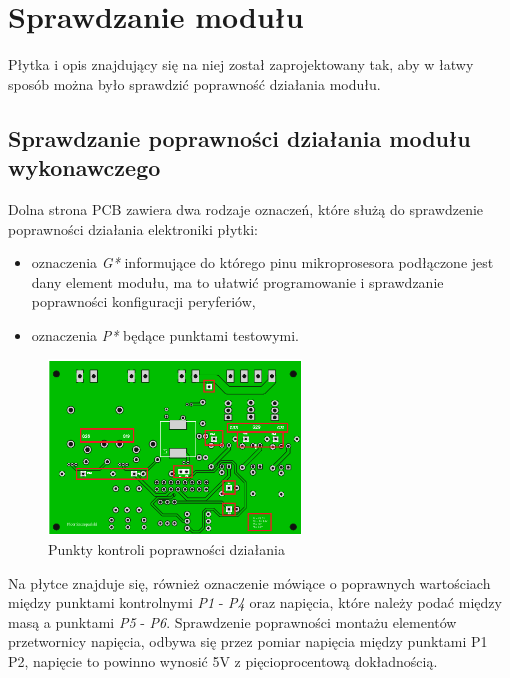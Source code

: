\documentclass[12pt, eng, twoside, openany, final]{mgr}
\begin{document}
    \section{Sprawdzanie modułu}
            Płytka i opis znajdujący się na niej został zaprojektowany tak, aby w łatwy sposób można było sprawdzić poprawność działania modułu. 
            
            \subsection{Sprawdzanie poprawności działania modułu wykonawczego}
            Dolna strona PCB zawiera dwa rodzaje oznaczeń, które służą do sprawdzenie poprawności działania elektroniki płytki:
            \begin{itemize}
                \item oznaczenia \emph{G*} informujące do którego pinu mikroprosesora podłączone jest dany element modułu, ma to ułatwić programowanie i sprawdzanie poprawności konfiguracji peryferiów,
                \item oznaczenia \emph{P*} będące punktami testowymi.
            \end{itemize}
               \begin{figure}[H]
                \begin{center}
                    \includegraphics[width=0.6\textwidth]{pcb_dol_zaz.png}
                    \caption{Punkty kontroli poprawności działania}
                \end{center}
                \end{figure}
            Na płytce znajduje się, również oznaczenie mówiące o poprawnych wartościach między punktami kontrolnymi \emph{P1} - \emph{P4} oraz napięcia, które należy podać między masą a punktami \emph{P5} - \emph{P6}.
            Sprawdzenie poprawności montażu elementów przetwornicy napięcia, odbywa się przez pomiar napięcia między punktami P1 P2, napięcie to powinno wynosić 5V z  pięcioprocentową dokładnością.
\end{document}
